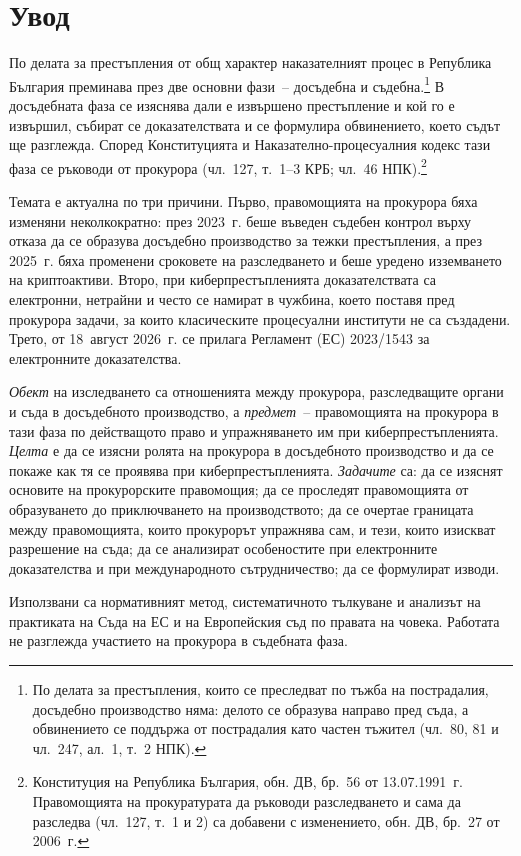 \section{Увод}
\label{sec:uvod}

По делата за престъпления от общ характер наказателният процес в Република България
преминава през две основни фази~-- досъдебна и съдебна.\footnote{По делата за
престъпления, които се преследват по тъжба на пострадалия, досъдебно производство няма:
делото се образува направо пред съда, а обвинението се поддържа от пострадалия като
частен тъжител (чл.~80, 81 и чл.~247, ал.~1, т.~2 НПК).} В досъдебната фаза се изяснява дали е извършено престъпление и кой го е
извършил, събират се доказателствата и се формулира обвинението, което съдът ще
разглежда. Според Конституцията и Наказателно-процесуалния кодекс тази фаза се ръководи
от прокурора (чл.~127, т.~1--3 КРБ; чл.~46 НПК).\footnote{Конституция на Република
България, обн. ДВ, бр.~56 от 13.07.1991~г. Правомощията на прокуратурата да ръководи
разследването и сама да разследва (чл.~127, т.~1 и 2) са добавени с изменението, обн. ДВ,
бр.~27 от 2006~г.}

Темата е актуална по три причини. Първо, правомощията на прокурора бяха изменяни
неколкократно: през 2023~г. беше въведен съдебен контрол върху отказа да се образува
досъдебно производство за тежки престъпления, а през 2025~г. бяха променени сроковете на
разследването и беше уредено изземването на криптоактиви. Второ, при киберпрестъпленията
доказателствата са електронни, нетрайни и често се намират в чужбина, което поставя пред
прокурора задачи, за които класическите процесуални институти не са създадени. Трето, от
18~август 2026~г. се прилага Регламент (ЕС) 2023/1543 за електронните доказателства.

\textit{Обект} на изследването са отношенията между прокурора, разследващите органи и
съда в досъдебното производство, а \textit{предмет}~-- правомощията на прокурора в тази
фаза по действащото право и упражняването им при киберпрестъпленията. \textit{Целта} е да
се изясни ролята на прокурора в досъдебното производство и да се покаже как тя се
проявява при киберпрестъпленията. \textit{Задачите} са: да се изяснят основите на
прокурорските правомощия; да се проследят правомощията от образуването до приключването
на производството; да се очертае границата между правомощията, които прокурорът
упражнява сам, и тези, които изискват разрешение на съда; да се анализират особеностите
при електронните доказателства и при международното сътрудничество; да се формулират
изводи.

Използвани са нормативният метод, систематичното тълкуване и анализът на практиката на
Съда на ЕС и на Европейския съд по правата на човека. Работата не разглежда участието на
прокурора в съдебната фаза.
